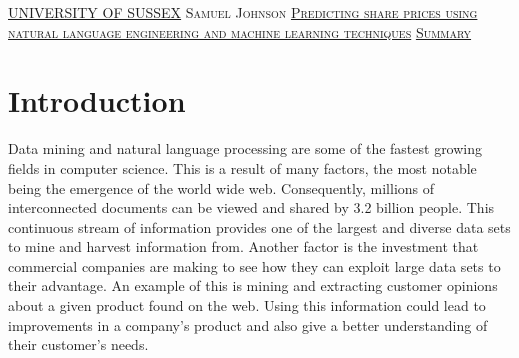 \documentclass[a4paper,11pt]{report}
\newcommand{\linespacing}{1.5}
\renewcommand{\baselinestretch}{\linespacing}
\begin{document}
\thispagestyle{empty}
\newpage
\null\vskip10mm
\begin{center}
\large
\underline{UNIVERSITY OF SUSSEX}
\vskip20mm
\textsc{Samuel Johnson}
\vskip20mm
\underline{\textsc{Predicting share prices using natural language engineering and machine learning techniques}}
\vskip0mm
\vskip20mm
\underline{\textsc{Summary}}
\vskip2mm
\end{center}
\renewcommand{\baselinestretch}{1.0}
\small\normalsize





\newpage
{}
\tableofcontents
\listoftables
{}
{}
\listoffigures
{}
{}


\newpage
{}


\chapter{Introduction}
\label{chap:intro}

Data mining and natural language processing are some of the fastest growing fields in computer science. This is a result of many factors, the most notable being the emergence of the world wide web.  Consequently, millions of interconnected documents can be viewed and shared by 3.2 billion people. This continuous stream of information provides one of the largest and diverse data sets to mine and harvest information from. Another factor is the investment that commercial companies are making to see how they can exploit large data sets to their advantage. An example of this is mining and extracting customer opinions about a given product found on the web. Using this information could lead to improvements in a company's product and also give a better understanding of their customer's needs.
\end{document}
